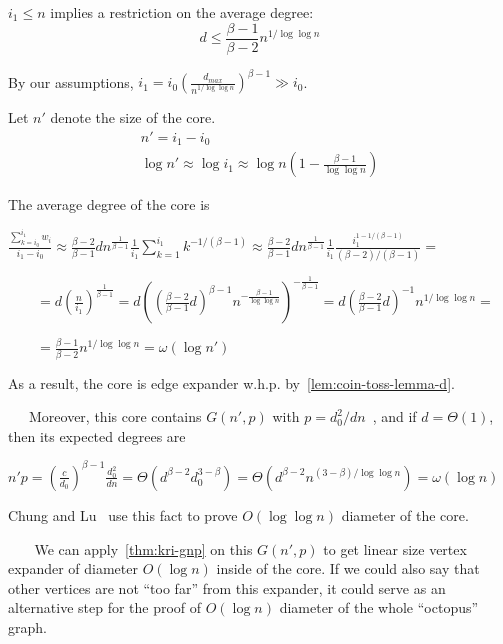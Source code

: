 $i_1\leq n$ implies a restriction on the average degree:
\begin{equation}
    d\leq\frac{\beta-1}{\beta-2}n^{1/\log\log n}
\end{equation}

By our assumptions, $i_1=i_0\left(\frac{d_{max}}{n^{1/\log\log n}}\right)^{\beta-1}\gg i_0$.

Let $n'$ denote the size of the core.
\begin{gather}
    n'=i_1-i_0\\
    \log n'\approx\log i_1\approx\log n\left(1-\frac{\beta-1}{\log\log n}\right)
\end{gather}

The average degree of the core is

$\frac{\sum_{k=i_0}^{i_1}{w_i}}{i_1-i_0}
\approx\frac{\beta-2}{\beta-1}dn^{\frac{1}{\beta-1}}\frac{1}{i_1}
\sum_{k=1}^{i_1}{k^{-1/(\beta-1)}}
\approx\frac{\beta-2}{\beta-1}dn^{\frac{1}{\beta-1}}\frac{1}{i_1}
\frac{i_1^{1-1/(\beta-1)}}{(\beta-2)/(\beta-1)}=$

$\qquad=d\left(\frac{n}{i_1}\right)^{\frac{1}{\beta-1}}
=d\left(\left(\frac{\beta-2}{\beta-1}d\right)^{\beta-1}n^{-\frac{\beta-1}{\log\log n}}\right)^{-\frac{1}{\beta-1}}
=d\left(\frac{\beta-2}{\beta-1}d\right)^{-1}n^{1/\log\log n}=$

$\qquad=\frac{\beta-1}{\beta-2}n^{1/\log\log n}=\omega(\log n')$

As a result, the core is edge expander w.h.p. by~\autoref{lem:coin-toss-lemma-d}.

\begin{shaded}
$\quad\,$
Moreover, this core contains $G(n',p)$ with $p=d_0^2/dn$~\cite{cl04},
and if $d=\Theta(1)$, then its expected degrees are

$n'p=\left(\frac{c}{d_0}\right)^{\beta-1}\frac{d_0^2}{dn}
=\Theta\left(d^{\beta-2}d_0^{3-\beta}\right)
=\Theta\left(d^{\beta-2}n^{(3-\beta)/\log\log n}\right)
=\omega(\log n)$
\end{shaded}

Chung and Lu~\cite{cl04} use this fact to prove $O(\log\log n)$ diameter of the core.

\begin{shaded}
$\quad\;\;$
We can apply~\autoref{thm:kri-gnp} on this $G(n',p)$ to get linear size
vertex expander of diameter $O(\log n)$ inside of the core.
If we could also say that other vertices are not ``too far'' from this expander,
it could serve as an alternative step for the proof
of $O(\log n)$ diameter of the whole ``octopus'' graph.
\end{shaded}

